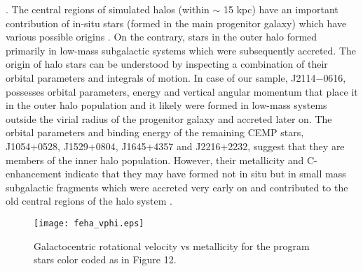 \citep{2007Natur.450.1020C, 2010ApJ...712..692C, 2012AAS...21922206B,  2013MNRAS.432.3391T, 2014MNRAS.439.3128T, 2016NatPh..12.1170C, 2018ApJ...859L...7C}. The central regions of simulated halos (within $\sim$ 15 kpc) have an important contribution of in-situ stars (formed in the main progenitor galaxy) which have various possible origins \citep{2004ApJ...612..894B, 2009ApJ...702.1058Z,2011MNRAS.416.2802F, 2011MNRAS.415.2652H, 2013MNRAS.432.3391T, 2015MNRAS.454.3185C, 2015ApJ...799..184P, 2016MNRAS.459L..46M}. On the contrary, stars in the outer halo formed primarily in low-mass subgalactic systems which were subsequently accreted. The origin of halo stars can be understood by inspecting a combination of their orbital parameters and integrals of motion. In case of our sample, J2114$-$0616, possesses orbital parameters, energy and vertical angular momentum that place it in the outer halo population and it likely were formed in low-mass systems outside the virial radius of the progenitor galaxy and accreted later on. The orbital parameters and binding energy of the remaining CEMP stars, J1054+0528, J1529+0804, J1645+4357 and J2216+2232, suggest that they are members of the inner halo population. However, their metallicity and C-enhancement indicate that they may have formed not in situ but in small mass subgalactic fragments which were accreted very early on and contributed to the old central regions of the halo system \citep{2018MNRAS.473.1656T, 2018ApJ...859L...7C}.




\begin{figure}[!ht]
\begin{center}
\texttt{[image: feha\_vphi.eps]}
\end{center}
\caption{Galactocentric rotational velocity vs metallicity for the program stars color coded as in Figure 12.}
\label{fig:vphi}
\end{figure}
